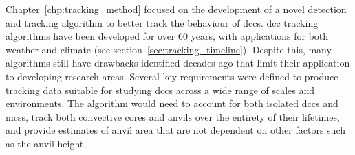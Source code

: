 

Chapter~\ref{chp:tracking_method} focused on the development of a novel detection and tracking algorithm to better track the behaviour of \acrshort{dcc}s.
\acrshort{dcc} tracking algorithms have been developed for over 60 years, with applications for both weather and climate (see section~\ref{sec:tracking_timeline}).
Despite this, many algorithms still have drawbacks identified decades ago \citep{augustine_mesoscale_1988} that limit their application to developing research areas.
Several key requirements were defined to produce tracking data suitable for studying \acrshort{dcc}s across a wide range of scales and environments.
The algorithm would need to account for both isolated \acrshort{dcc}s and \acrshort{mcs}s, track both convective cores and anvils over the entirety of their lifetimes, and provide estimates of anvil area that are not dependent on other factors such as the anvil height.


